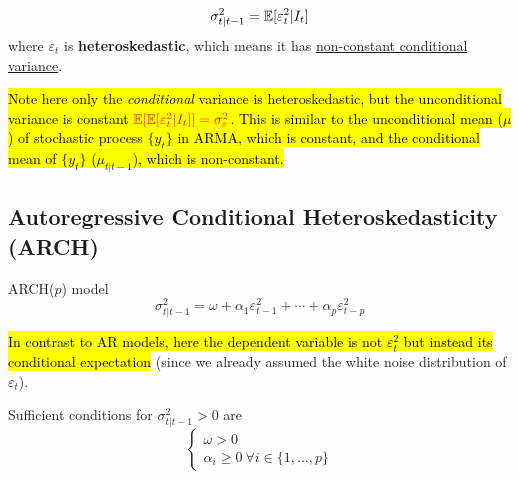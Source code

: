 \documentclass[11pt]{article}
\begin{document}
	        \begin{remark}
	            \begin{equation}
	                \sigma_{t|t-1}^2 = \mathbb{E}[{\varepsilon_t^2|I_t}]
	            \end{equation}
	            where $\varepsilon_t$ is \textbf{heteroskedastic}, which means it has \ul{non-constant conditional variance}.
	        \end{remark}
	        
	        \begin{remark}
	            \hl{Note here only the \emph{conditional} variance is heteroskedastic, but the unconditional variance is constant $\textcolor{red}{\mathbb{E}[{\mathbb{E}[{\varepsilon_t^2|I_t}]}] = \sigma_\varepsilon^2}$. This is similar to the unconditional mean ($\mu$) of stochastic process $\{y_t\}$ in ARMA, which is constant, and the conditional mean of $\{y_t\}$ ($\mu_{t|t-1}$), which is non-constant.}
	        \end{remark}
	    \subsection{Autoregressive Conditional Heteroskedasticity (ARCH)}
            \begin{definition}
                ARCH($p$) model
                \begin{equation}
                    \sigma_{t|t-1}^2 = \omega + \alpha_1 \varepsilon_{t-1}^2 + \cdots + \alpha_p \varepsilon_{t-p}^2
                \end{equation}
            \end{definition}
            
            \begin{remark}
                \hl{In contrast to AR models, here the dependent variable is not $\varepsilon_t^2$ but instead its conditional expectation} (since we already assumed the white noise distribution of $\varepsilon_t$).
            \end{remark}
            
            \begin{remark}
                Sufficient conditions for $\sigma_{t|t-1}^2 > 0$ are 
                \begin{equation}
                    \begin{cases}
                        \omega > 0 \\
                        \alpha_i \geq 0\ \forall i \in \{1, \dots, p\}
                    \end{cases}
                \end{equation}
            \end{remark}
            
\end{document}
